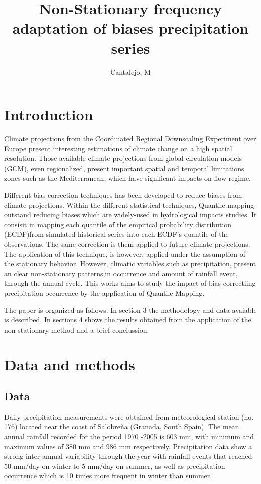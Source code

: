 \documentclass[a4paper,11pt]{article}
\begin{document}
\title{Non-Stationary frequency adaptation of biases precipitation series}
\author{Cantalejo, M}
\maketitle
{}



\section{Introduction}\label{sec1}
Climate projections from the Coordinated Regional Downscaling Experiment over Europe present interesting estimations of climate change on a high spatial resolution. Those available climate projections  from global circulation models (GCM), even regionalized, present important spatial and temporal limitations zones such as the Mediterranean, which have significant impacts on flow regime.

Different bias-correction techniques has been developed to reduce biases from climate projections. Within the different statistical techniques, Quantile mapping outstand reducing biases which are widely-used in hydrological impacts studies. It consisit in mapping each quantile of the empirical probability distribution (ECDF)from simulated historical series into each ECDF's quantile of the observations. The same correction is them applied to future climate projections. The application of this technique, is however, applied under the assumption of the stationary behavior. However, climatic variables such as precipitation, present an clear non-stationary patterns,in occurrence and amount of rainfall event, through the annual cycle. This works aims to study the impact of bias-correctiing precipitation occurrence by the application of Quantile Mapping. 

The paper is organized as follows. In section 3 the methodology and data avaiable is described. In sections 4 shows the results obtained from the application of the non-stationary method and a brief conclussion.  


\section{Data and methods}\label{sec2}
\subsection{Data} 
Daily precipitation measurements were obtained from meteorological station (no. 176) located near the coast of Salobreña (Granada, South Spain). The mean annual rainfall recorded for the period 1970 -2005 is 603 mm, with minimum and maximum values of 380 mm and 986 mm respectively. Precipitation data show a strong inter-annual variability through the year with rainfall events that reached 50 mm/day on winter to 5 mm/day on summer, as well as precipitation occurrence which is 10 times more frequent in winter than summer.
\end{document}
